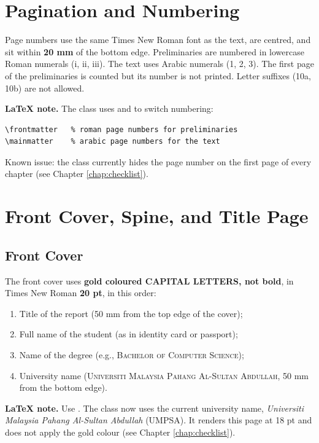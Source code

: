 \section{Pagination and Numbering}

Page numbers use the same Times New Roman font as the text, are centred, and sit within \textbf{20 mm} of the bottom edge. Preliminaries are numbered in lowercase Roman numerals (i, ii, iii). The text uses Arabic numerals (1, 2, 3). The first page of the preliminaries is counted but its number is not printed. Letter suffixes (10a, 10b) are not allowed.

\textbf{LaTeX note.} The class uses \texttt{\string\frontmatter} and \texttt{\string\mainmatter} to switch numbering:
\begin{verbatim}
\frontmatter   % roman page numbers for preliminaries
\mainmatter    % arabic page numbers for the text
\end{verbatim}
Known issue: the class currently hides the page number on the first page of every chapter (see Chapter \ref{chap:checklist}).

\section{Front Cover, Spine, and Title Page}

\subsection{Front Cover}

The front cover uses \textbf{gold coloured CAPITAL LETTERS, not bold}, in Times New Roman \textbf{20 pt}, in this order:
\begin{enumerate}
    \item Title of the report (50 mm from the top edge of the cover);
    \item Full name of the student (as in identity card or passport);
    \item Name of the degree (e.g., \textsc{Bachelor of Computer Science});
    \item University name (\textsc{Universiti Malaysia Pahang Al-Sultan Abdullah}, 50 mm from the bottom edge).
\end{enumerate}

\textbf{LaTeX note.} Use \texttt{\string\umpCoverPage}. The class now uses the current university name, \emph{Universiti Malaysia Pahang Al-Sultan Abdullah} (UMPSA). It renders this page at 18 pt and does not apply the gold colour (see Chapter \ref{chap:checklist}).

